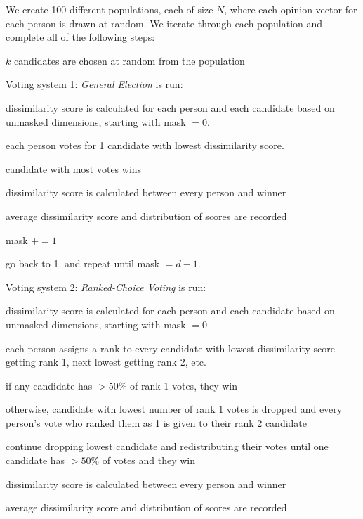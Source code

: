 We create 100 different populations, each of size $N$, where each opinion vector for each person is drawn at random.
We iterate through each population and complete all of the following steps:
\begin{enum_tight}
\item $k$ candidates are chosen at random from the population
\item Voting system 1: {\it General Election} is run:
    \begin{enum_tight}
    \item dissimilarity score is calculated for each person and each candidate based on unmasked dimensions, starting with mask $=0$.
    \item each person votes for 1 candidate with lowest dissimilarity score.
    \item candidate with most votes wins
    \item dissimilarity score is calculated between every person and winner
    \item average dissimilarity score and distribution of scores are recorded
    \item mask $+= 1$
    \item go back to 1. and repeat until mask $= d-1$.
    \end{enum_tight}
\item Voting system 2: {\it Ranked-Choice Voting} is run:
    \begin{enum_tight}
    \item dissimilarity score is calculated for each person and each candidate based on unmasked dimensions, starting with mask $=0$
    \item each person assigns a rank to every candidate with lowest dissimilarity score getting rank 1, next lowest getting rank 2, etc.
    \begin{enum_tight}
        \item if any candidate has $> 50\%$ of rank 1 votes, they win
        \item otherwise, candidate with lowest number of rank 1 votes is dropped and every person's vote who ranked them as 1 is given to their rank 2 candidate
        \item continue dropping lowest candidate and redistributing their votes until one candidate has $> 50\%$ of votes and they win
    \end{enum_tight}
    \item dissimilarity score is calculated between every person and winner
    \item average dissimilarity score and distribution of scores are recorded

\end{enum_tight}
\end{enum_tight}
